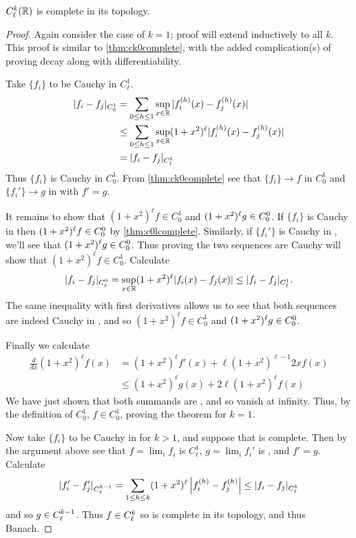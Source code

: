       \begin{thm}
        \label{thm:cklcomplete}
        ${C^k_\ell}(\mathbb{R})$ is complete in its topology.
      \end{thm}
      \begin{proof}
        Again consider the case of $k=1$; proof will extend inductively to all $k$.
        This proof is similar to \cref{thm:ck0complete}, with the added complication(s) of proving decay along with differentiability.

        Take $\{f_i\}$ to be Cauchy in $C^1_\ell$.
        \begin{align*}
          |f_i-f_j|_{C^1_0}
          &= \sum_{0\le h\le 1}\sup_{x\in\mathbb{R}}|f_i^{(h)}(x)-f_j^{(h)}(x)|
          \\&\le \sum_{0\le h\le 1}\sup_{x\in\mathbb{R}}(1+x^2)^\ell|f_i^{(h)}(x)-f_j^{(h)}(x)|
          \\&= |f_i -f_j|_{C^1_\ell}
        \end{align*}
        Thus $\{f_i\}$ is Cauchy in $C^1_0$.
        From \cref{thm:ck0complete} see that $\{f_i\}\rightarrow f$ in $C^1_0$ and $\{f_i'\}\rightarrow g$ in \Coo with $f'=g$.

        It remains to show that $(1+x^2)^\ell f\in C^1_0$ and $(1+x^2)^\ell g\in{C^0_0}$.
        If $\{f_i\}$ is Cauchy in \Cl then $(1+x^2)^\ell f\in{C^0_0}$ by \cref{thm:c0lcomplete}.
        Similarly, if $\{f_i'\}$ is Cauchy in \Cl, we'll see that $(1+x^2)^\ell g\in{C^0_0}$.
        Thus proving the two sequences are Cauchy will show that $(1+x^2)^\ell f\in C^1_0$.
        Calculate
        \begin{align*}
          |f_i-f_j|_{C^0_\ell}
          = \sup_{x\in\mathbb{R}}(1+x^2)^\ell|f_i(x)-f_j(x)|
          \le |f_i -f_j|_{C^1_\ell} \text{.}
        \end{align*}
        The same inequality with first derivatives allows us to see that both sequences are indeed Cauchy in \Cl, and so $(1+x^2)^\ell f\in C^1_0$ and $(1+x^2)^\ell g\in{C^0_0}$.

        Finally we calculate
        \begin{align*}
          \frac{d}{dx}(1+x^2)^\ell f(x)
          &= (1+x^2)^\ell f'(x) + \ell(1+x^2)^{\ell-1}2xf(x)\\
          &\le (1+x^2)^\ell g(x) + 2\ell(1+x^2)^\ell f(x)
        \end{align*}
        We have just shown that both summands are \Coo, and so vanish at infinity.
        Thus, by the definition of $C^1_0$, $f\in C^1_0$, proving the theorem for $k=1$.

        Now take $\{f_i\}$ to be Cauchy in \Ckl for $k>1$, and suppose that \Ckml is complete.
        Then by the argument above see that $f=\lim_i f_i$ is $C^1_\ell$, $g=\lim_i f_i'$ is \Cl, and $f'=g$.
        Calculate
        \begin{align*}
          |f_i'-f_j'|_{C^{k-1}_\ell}
          = \sum_{1\le h\le k} (1+x^2)^\ell\left|f_i^{(h)}-f_j^{(h)}\right|
          \le |f_i-f_j|_{C^k_\ell}
        \end{align*}
        and so $g\in{C^{k-1}_\ell}$.
        Thus $f\in{C^k_\ell}$ so \Ckl is complete in its topology, and thus Banach.
      \end{proof}

